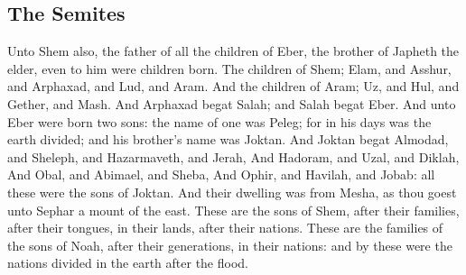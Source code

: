 \begin{biblechapter}
\subsection*{The Semites}
\verse Unto Shem also, the father of all the children of Eber, the brother of Japheth the elder, even to him were children born.
\verse The children of Shem; Elam, and Asshur, and Arphaxad, and Lud, and Aram.
\verse And the children of Aram; Uz, and Hul, and Gether, and Mash.
\verse And Arphaxad begat Salah; and Salah begat Eber.
\verse And unto Eber were born two sons: the name of one was Peleg; for in his days was the earth divided; and his brother's name was Joktan.
\verse And Joktan begat Almodad, and Sheleph, and Hazarmaveth, and Jerah,
\verse And Hadoram, and Uzal, and Diklah,
\verse And Obal, and Abimael, and Sheba,
\verse And Ophir, and Havilah, and Jobab: all these were the sons of Joktan.
\verse And their dwelling was from Mesha, as thou goest unto Sephar a mount of the east.
\verse These are the sons of Shem, after their families, after their tongues, in their lands, after their nations.
\verse These are the families of the sons of Noah, after their generations, in their nations: and by these were the nations divided in the earth after the flood.
\end{biblechapter}

